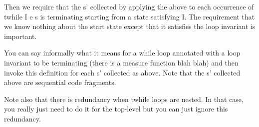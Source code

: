 Then we require that the s' collected by applying the above to each occurrence of twhile {I} e s is terminating starting from a state satisfying I.  The requirement that we know nothing about the start state except that it satisfies the loop invariant is important.

You can say informally what it means for a while loop annotated with a loop invariant to be terminating (there is a measure function blah blah) and then invoke this definition for each s' collected as above.  Note that the s' collected above are sequential code fragments.  

Note also that there is redundancy when twhile loops are nested.  In that case, you really just need to do it for the top-level but you can just ignore this redundancy.



